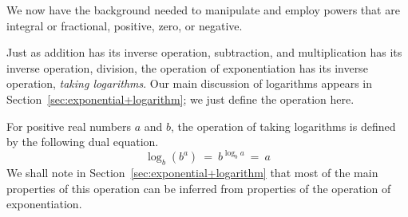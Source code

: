 \medskip

We now have the background needed to manipulate and employ powers that are integral or fractional, positive, zero, or negative.

\bigskip

\noindent {}

\bigskip

\noindent
Just as addition has its inverse operation, subtraction, and multiplication has its inverse operation, division, the operation of exponentiation has its inverse operation, {\it taking logarithms}.  Our main discussion of logarithms appears in Section~\ref{sec:exponential+logarithm}; we just define the operation here.

\medskip


For positive real numbers $a$ and $b$, the operation of taking logarithms is defined by the following dual equation.
\[ \log_b (b^a) \ = \ b^{\log_b a} \ = \ a \]
We shall note in Section~\ref{sec:exponential+logarithm} that most of the main properties of this operation can be inferred from properties of the operation of exponentiation.

\bigskip

